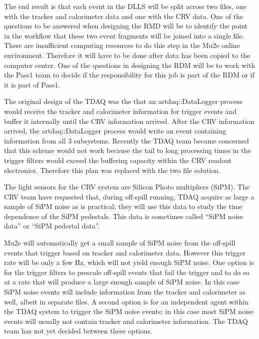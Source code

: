 
The end result is that each event in the DLLS will be split across two files, one with the
tracker and calorimeter data and one with the CRV data.
One of the questions to be answered when designing the RMD will be to identify
the point in the workflow that these two event fragments will be joined into a single file.
There are insufficient computing resources to do this step in the Mu2e online environment.
Therefore it will have to be done after data has been copied to the computer center.
One of the questions in designing the RDM will be to work with the Pass1 team to
decide if the responsibility for this job is part of the RDM or if it is part of Pass1.

The original design of the TDAQ was the that an {\code artdaq::DataLogger} process
would receive the tracker and calorimeter information for trigger events
and buffer it internally until the CRV information arrived.
After the CRV information arrived,
the {\code artdaq::DataLogger} process would write an event containing information from all 3 subsystems.
Recently the TDAQ team became concerned that this scheme would not work because
the tail to long processing times in the trigger filters would exceed the buffering capacity within
the CRV readout electronics.
Therefore this plan was replaced with the two file solution.


The light sensors for the CRV system are Silicon Photo multipliers (SiPM).
The CRV team have requested that, during off-spill running,
TDAQ acquire as large a sample of SiPM noise as is practical;
they will use this data to study the time dependence of the SiPM pedestals.
This data is sometimes called ``SiPM noise data'' or ``SiPM pedestal data''.

Mu2e will automatically get a small sample of SiPM noise from the off-spill events
that trigger based on tracker and calorimeter data.
However this trigger rate will be only a few Hz, which will not yield enough SiPM noise.
One option is for the trigger filters to prescale off-spill events that fail the trigger
and to do so at a rate that will produce a large enough sample of SiPM noise.
In this case SiPM noise events will include information from the tracker and calorimeter as well,
albeit in separate files.
A second option is for an independent agent within the TDAQ system to trigger the SiPM noise events;
in this case most SiPM noise events will usually not contain tracker and calorimeter information.
The TDAQ team has not yet decided between these options.

